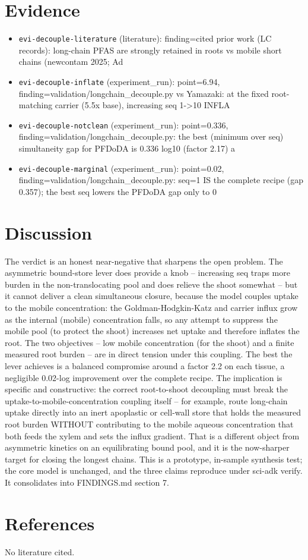 \documentclass{article}
\begin{document}
\section{Evidence}
\begin{itemize}
  \item \texttt{evi-decouple-literature} (literature): finding=cited prior work (LC records): long-chain PFAS are strongly retained in roots vs mobile short chains (newcontam 2025; Ad
  \item \texttt{evi-decouple-inflate} (experiment\_run): point=6.94, finding=validation/longchain\_decouple.py vs Yamazaki: at the fixed root-matching carrier (5.5x base), increasing seq 1->10 INFLA
  \item \texttt{evi-decouple-notclean} (experiment\_run): point=0.336, finding=validation/longchain\_decouple.py: the best (minimum over seq) simultaneity gap for PFDoDA is 0.336 log10 (factor 2.17) a
  \item \texttt{evi-decouple-marginal} (experiment\_run): point=0.02, finding=validation/longchain\_decouple.py: seq=1 IS the complete recipe (gap 0.357); the best seq lowers the PFDoDA gap only to 0
\end{itemize}

\section{Discussion}
The verdict is an honest near-negative that sharpens the open problem. The asymmetric bound-store lever does provide a knob -- increasing seq traps more burden in the non-translocating pool and does relieve the shoot somewhat -- but it cannot deliver a clean simultaneous closure, because the model couples uptake to the mobile concentration: the Goldman-Hodgkin-Katz and carrier influx grow as the internal (mobile) concentration falls, so any attempt to suppress the mobile pool (to protect the shoot) increases net uptake and therefore inflates the root. The two objectives -- low mobile concentration (for the shoot) and a finite measured root burden -- are in direct tension under this coupling. The best the lever achieves is a balanced compromise around a factor 2.2 on each tissue, a negligible 0.02-log improvement over the complete recipe. The implication is specific and constructive: the correct root-to-shoot decoupling must break the uptake-to-mobile-concentration coupling itself -- for example, route long-chain uptake directly into an inert apoplastic or cell-wall store that holds the measured root burden WITHOUT contributing to the mobile aqueous concentration that both feeds the xylem and sets the influx gradient. That is a different object from asymmetric kinetics on an equilibrating bound pool, and it is the now-sharper target for closing the longest chains. This is a prototype, in-sample synthesis test; the core model is unchanged, and the three claims reproduce under sci-adk verify. It consolidates into FINDINGS.md section 7.

\section{References}
No literature cited.
\end{document}
